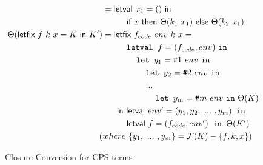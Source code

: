 \documentclass{article}
\theoremstyle{definition}
\theoremstyle{remark}
\numberwithin{equation}{section}
\begin{document}
\begin{figure}[!ht]
\begin{align*}
    &=\textsf{letval }x_1=()\textsf{ in}\\
    &\kern1cm \textsf{if }x\textsf{ then }\Theta(k_1\ x_1)
    \ \textsf{else }\Theta(k_2\ x_1)\\
\Theta(\textsf{letfix }f\ k\ x=K\textsf{ in }K')   %
    &=\textsf{letfix }f_{code}\ env\ k\ x=\\
    &\kern1cm   \texttt{letval }f=(f_{code}, env)\ \texttt{in}\\
    &\kern1.4cm   \texttt{let }y_1=\texttt{\#}1\ env\ \texttt{in}\\
    &\kern1.8cm   \texttt{let }y_2=\texttt{\#}2\ env\ \texttt{in}\\
    &\kern1.8cm   ...\\
    &\kern2.2cm   \texttt{let }y_m=\texttt{\#}m\ env\ \texttt{in}\ \Theta(K)\\
    &\kern0.6cm\textsf{in letval }env'=(y_1, y_2, \ ...\ ,y_m)\texttt{ in}\\
    &\kern1cm\textsf{letval }f=(f_{code}, env')\texttt{ in }\Theta(K')\\  %
    (&where\ \{y_1,\ ...\ ,y_m\}=\mathcal{F}(K)-\{f,k,x\})
\end{align*}
  \caption{Closure Conversion for CPS terms}
  \label{fig-sub}
\end{figure}
\end{document}
